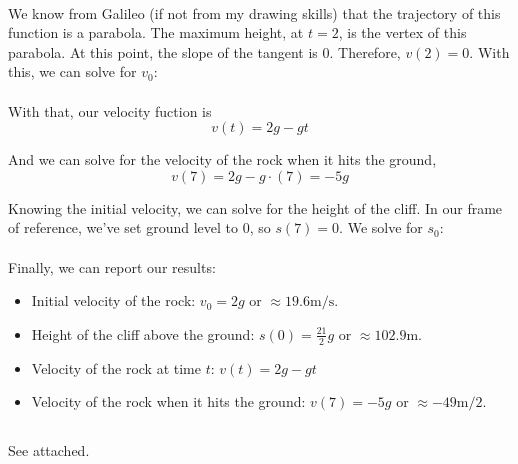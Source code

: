 \documentclass{article}
\begin{document}
\\

We know from Galileo (if not from my drawing skills) that the trajectory of this function is a parabola. The maximum height, at $t=2$, is the vertex of this parabola. At this point, the slope of the tangent is 0. Therefore, $v(2)=0$. With this, we can solve for $v_{0}$:
\\

\\


With that, our velocity fuction is
$$
\boxed{v(t) = 2g - gt}
$$

And we can solve for the velocity of the rock when it hits the ground,
$$
v(7) = 2g - g\cdot(7) = \boxed{-5g}
$$

Knowing the initial velocity, we can solve for the height of the cliff. In our frame of reference, we've set ground level to 0, so $s(7) = 0$. We solve for $s_{0}$:
\\

\Longunderstack[l]{
}
\\

Finally, we can report our results:


\begin{itemize}
  \item Initial velocity of the rock: $\boxed{v_{0} = 2g} \text{ or } \approx 19.6\text{m/s}$.
  \item Height of the cliff above the ground: $\boxed{s(0) = \frac{21}{2}g} \text{ or } \approx 102.9\text{m}$.
  \item Velocity of the rock at time $t$: $\boxed{v(t) = 2g - gt}$
  \item Velocity of the rock when it hits the ground: $\boxed{v(7) = -5g} \text { or } \approx -49\text{m/2}$.
\end{itemize}

\subsection{}
See attached.
\end{document}
